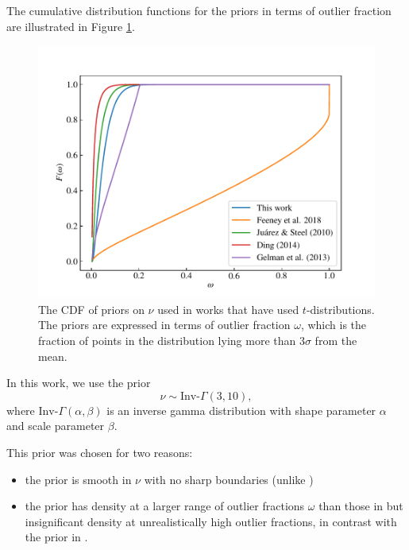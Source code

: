 \documentclass[fleqn,usenatbib]{mnras}
\begin{document}
The cumulative distribution functions for the priors in terms of outlier
fraction are illustrated in Figure \ref{fig:priors.outlier_frac}.
\begin{figure}
	\includegraphics[width=\columnwidth]{graphics/cdf_outlier_frac}
    \caption{The CDF of priors on $\nu$ used in works that have used
    $t$-distributions. The priors are expressed in terms of outlier fraction
    $\omega$, which is the fraction of points in the distribution lying more
    than 3$\sigma$ from the mean.}
    \label{fig:priors.outlier_frac}
\end{figure}

In this work, we use the prior
\begin{equation}
    \nu \sim \text{Inv-}\Gamma(3, 10),
\end{equation}
where $\text{Inv-}\Gamma(\alpha, \beta)$ is an inverse gamma distribution with
{\color{red} shape parameter $\alpha$ and scale parameter $\beta$}.

This prior was chosen for two reasons:
\begin{itemize}
    \item the prior is smooth in $\nu$ with no sharp boundaries (unlike
          \citet{Gelman:2013})
    \item the prior has density at a larger range of outlier fractions $\omega$
          than those in \citet{Juarez:2010, Ding:2014} but insignificant density
          at unrealistically high outlier fractions, in contrast with the prior
          in \citet{Feeney:2018}.
\end{itemize}



\bsp	%
\label{lastpage}
\end{document}

